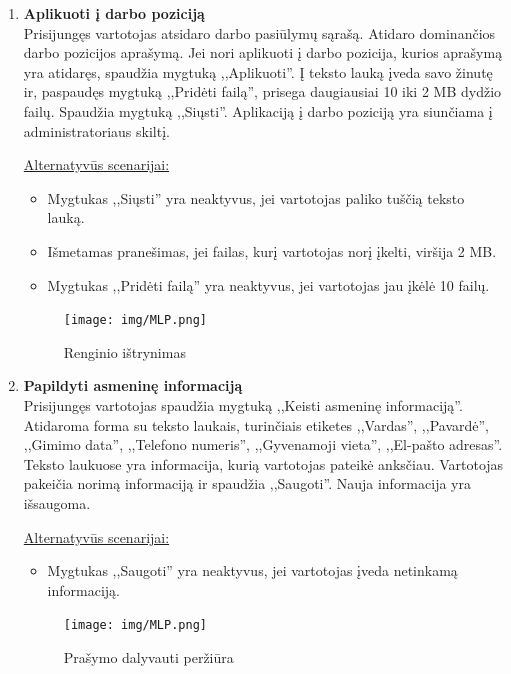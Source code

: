 \documentclass{VUMIFPSkursinis}
\begin{document}
\begin{enumerate} [label = \textbf{U\arabic*.}]
			\item \textbf{Aplikuoti į darbo poziciją} \\
				Prisijungęs vartotojas atsidaro darbo pasiūlymų sąrašą. Atidaro dominančios darbo pozicijos aprašymą. Jei nori aplikuoti į darbo pozicija, kurios aprašymą yra atidaręs, spaudžia mygtuką ,,Aplikuoti''. Į teksto lauką įveda savo žinutę ir, paspaudęs mygtuką ,,Pridėti failą'', prisega daugiausiai 10 iki 2 MB dydžio failų. Spaudžia mygtuką ,,Siųsti''. Aplikaciją į darbo poziciją yra siunčiama į administratoriaus skiltį.
				
				\underline{Alternatyvūs scenarijai:}
				\begin{itemize}
					\item Mygtukas ,,Siųsti'' yra neaktyvus, jei vartotojas paliko tuščią teksto lauką.
					\item Išmetamas pranešimas, jei failas, kurį vartotojas norį įkelti, viršija 2 MB.
					\item Mygtukas ,,Pridėti failą'' yra neaktyvus, jei vartotojas jau įkėlė 10 failų.
				\end{itemize}
				
				\begin{figure}[H]
					\centering
					\texttt{[image: img/MLP.png]}
					\caption{Renginio ištrynimas}
					\label{fig:istrinti-rengini}
				\end{figure}
				
			\item \textbf{Papildyti asmeninę informaciją} \\
				Prisijungęs vartotojas spaudžia mygtuką ,,Keisti asmeninę informaciją''. Atidaroma forma su teksto laukais, turinčiais etiketes ,,Vardas'', ,,Pavardė'', ,,Gimimo data'', ,,Telefono numeris'', ,,Gyvenamoji vieta'', ,,El-pašto adresas''. Teksto laukuose yra informacija, kurią vartotojas pateikė anksčiau. Vartotojas pakeičia norimą informaciją ir spaudžia ,,Saugoti''. Nauja informacija yra išsaugoma.
				
				\underline{Alternatyvūs scenarijai:}
				\begin{itemize}
					\item Mygtukas ,,Saugoti'' yra neaktyvus, jei vartotojas įveda netinkamą informaciją.
				\end{itemize}
				
				\begin{figure}[H]
					\centering
					\texttt{[image: img/MLP.png]}
					\caption{Prašymo dalyvauti peržiūra}
					\label{fig:priimti-dalyvi}
				\end{figure}


\end{enumerate}
\end{document}
